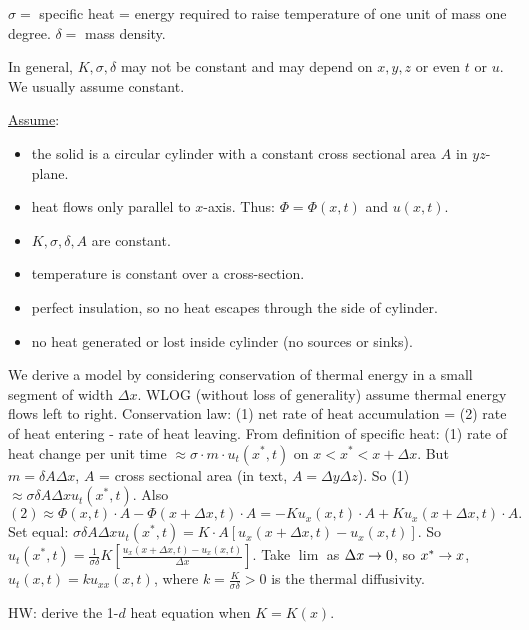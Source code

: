\documentclass[]{article}
\begin{document}
\begin{definition}
	$\sigma = $ specific heat = energy required to raise temperature of one unit of mass one degree.
	$\delta = $ mass density.
	\begin{note}
		In general, $K,\sigma,\delta$ may not be constant and may depend on $x,y,z$ or even $t$ or $u$. We usually assume constant.
	\end{note}
\end{definition}

\begin{definition}
	\underline{Assume}:
	\begin{itemize}
		\item the solid is a circular cylinder with a constant cross sectional area $A$ in $yz$-plane.
		\item heat flows only parallel to $x$-axis. Thus: $\Phi = \Phi(x,t)$ and $u(x,t)$.
		\item $K,\sigma,\delta,A$ are constant.
		\item temperature is constant over a cross-section.
		\item perfect insulation, so no heat escapes through the side of cylinder.
		\item  no heat generated or lost inside cylinder (no sources or sinks).
	\end{itemize}
\end{definition}

We derive a model by considering conservation of thermal energy in a small segment of width $\Delta x$.
WLOG (without loss of generality) assume thermal energy flows left to right.
Conservation law: (1) net rate of heat accumulation = (2) rate of heat entering - rate of heat leaving.
From definition of specific heat: (1) rate of heat change per unit time $\approx  \sigma \cdot m \cdot u_t(x^*,t)$ on $x<x^*<x+\Delta x$.
But $m=\delta A \Delta x$, $A$ = cross sectional area (in text, $A=\Delta y \Delta z$). So (1) $\approx \sigma \delta A \Delta x u_t(x^*,t)$. Also $$(2) \approx \Phi(x,t) \cdot A - \Phi(x+\Delta x,t)\cdot A = -K u_x(x,t)\cdot A + Ku_x(x+\Delta x,t)\cdot A.$$
Set equal: $\sigma \delta A \Delta x u_t(x^*,t) = K\cdot A [ u_x(x+\Delta x,t)- u_x(x,t)]$. So $u_t(x^*,t) = \frac{1}{\sigma\delta}K \left[ \frac{u_x(x+\Delta x,t) - u_x(x,t)}{\Delta x} \right]$.
Take $\lim$ as $\Delta x \rightarrow 0$, so $x^* \rightarrow x$, $u_t(x,t) = k u_{xx}(x,t)$, where $k = \frac{K}{\sigma\delta}>0$ is the thermal diffusivity.

HW: derive the 1-$d$ heat equation when $K=K(x)$.
\end{document}
